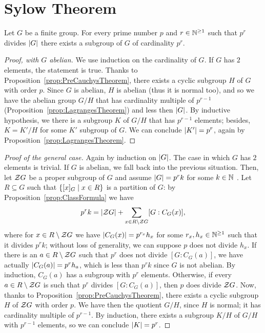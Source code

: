 
\section{Sylow Theorem}

\begin{lemma}\label{lem:PreSylowTheoremI}
Let \(G\) be a finite group. For every prime number \(p\) and \(r \in \mathbb N^{\ge 1}\) such that \(p^r\) divides \(\left\lvert G\right\rvert\) there exists a subgroup of \(G\) of cardinality \(p^r\).
\end{lemma}

\begin{proof}[Proof, with \(G\) abelian] We use induction on the cardinality of \(G\). If \(G\) has \(2\) elements, the statement is true. Thanks to Proposition~\ref{prop:PreCauchysTheorem}, there exists a cyclic subgroup \(H\) of \(G\) with order \(p\). Since \(G\) is abelian, \(H\) is abelian (thus it is normal too), and so we have the abelian group \(G/H\) that has cardinality multiple of \(p^{r-1}\) (Proposition~\ref{prop:LagrangesTheorem}) and less then \(\left\lvert G\right\rvert\). By inductive hypothesis, we there is a subgroup \(K\) of \(G/H\) that has \(p^{r-1}\) elements; besides, \(K = K'/H\) for some \(K'\) subgroup of \(G\). We can conclude \(\left\lvert K'\right\rvert = p^{r}\), again by Proposition~\ref{prop:LagrangesTheorem}.
\end{proof}

\begin{proof}[Proof of the general case]
Again by induction on \(\left\lvert G\right\rvert\). The case in which \(G\) has \(2\) elements is trivial. If \(G\) is abelian, we fall back into the previous situation. Then, let \(\mathcal Z G\) be a proper subgroup of \(G\) and assume \(\left\lvert G\right\rvert = p^r k\) for some \(k \in \mathbb N\) . Let \(R \subseteq G\) such that \(\left\{[x]_G \mid x \in R\right\}\) is a partition of \(G\): by Proposition~\ref{prop:ClassFormula} we have
\[p^r k = \left\lvert\mathcal Z G\right\rvert + \sum_{x \in R \setminus \mathcal Z G} [G:C_G(x)] ,\]
where for \(x \in R \setminus \mathcal Z G\) we have \(\left\lvert C_G (x)\right\rvert = p^{r_x} h_x\) for some \(r_x, h_x \in \mathbb N^{\ge 1}\) such that it divides \(p^r k\); without loss of generality, we can suppose \(p\) does not divide \(h_x\). If there is an \(a \in R \setminus \mathcal Z G\) such that \(p^r\) does not divide \([G:C_G(a)]\), we have actually \(\left\lvert C_G(a)\right\rvert = p^r h_a\), which is less than \(p^r k\) since \(G\) is not abelian. By induction, \(C_G(a)\) has a subgroup with \(p^r\) elements. Otherwise, if every \(a \in R \setminus \mathcal Z G\) is such that \(p^r\) divides \([G:C_G(a)]\), then \(p\) does divide \(\mathcal Z G\). Now, thanks to Proposition~\ref{prop:PreCauchysTheorem}, there exists a cyclic subgroup \(H\) of \(\mathcal Z G\) with order \(p\). We have then the quotient \(G/H\), since \(H\) is normal; it has cardinality multiple of \(p^{r-1}\). By induction, there exists a subgroup \(K/H\) of \(G/H\) with \(p^{r-1}\) elements, so we can conclude \(\left\lvert K\right\rvert = p^r\).
\end{proof}

